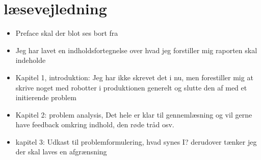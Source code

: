 \section{læsevejledning}
\begin{itemize}
  \item Preface skal der blot ses bort fra
  \item Jeg har lavet en indholdsfortegnelse over hvad jeg forstiller mig raporten skal indeholde
  \item Kapitel 1, introduktion: Jeg har ikke skrevet det i nu, men forestiller mig at skrive noget med robotter i produktionen generelt og slutte den af med et initierende problem
  \item Kapitel 2: problem analysis, Det hele er klar til gennemlæsning og vil gerne have feedback omkring indhold, den røde tråd osv. 
  \item kapitel 3: Udkast til problemformulering, hvad synes I? derudover tænker jeg der skal laves en afgrænsning 

\end{itemize}

